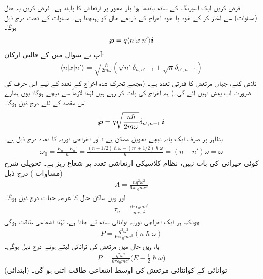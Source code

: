 فرض کریں ایک  اسپرنگ کے ساتھ باندھا ہوا بار  محور  پر ارتعاش کا پابند ہے۔ فرض  کریں یہ حال  (مساوات)  سے آغاز کر کے خود با خود اخراج   کے ذریعے  حال  کو  پہنچتا ہے۔ مساوات کے تحت درج ذیل ہوگا۔
\begin{align*}
	{\ensuremath{{\boldsymbol{\wp}}}} = q\langle n|x|n'\rangle{\boldsymbol{i}}
\end{align*}
آپ نے سوال  میں  کے قالبی ارکان:
\begin{align*}
	\langle n|x|n'\rangle = \sqrt{\frac{\hslash}{2m\omega}}(\sqrt{n'}\delta_{n,n'-1}+\sqrt{n}\delta_{n',n-1})
\end{align*}
 تلاش کئے، جہاں مرتعش کا  قدرتی تعدد  ہے۔ (مجھے تحرک شدہ اخراج کے تعدد کے لیے اس حرف کی ضرورت اب پیش نہیں آئے گی۔)   ہم اخراج کی بات کر رہے ہیں لہٰذا  لازماً   سے نیچے  ہوگا؛ یوں  ہمارے اس مقصد کے لئے درج ذیل ہوگا۔
\begin{align}
	{\ensuremath{{\boldsymbol{\wp}}}} = q\sqrt{\frac{n\hslash}{2m\omega}}\delta_{n', n-1}\,{\boldsymbol{i}}
\end{align}
بظاہر    پر صرف ایک پایہ   نیچے تحویل  ممکن ہے ؛  اور اخراجی نوریہ کا تعدد درج ذیل ہے۔
\begin{align}
	\omega_0 = \frac{E_n-E_n'}{\hslash} = \frac{(n+1/2)\hslash\omega - (n'+ 1/2)\hslash\omega}{\hslash} =(n-n')\omega = \omega
\end{align}
کوئی حیرانی  کی بات نہیں،  نظام کلاسیکی ارتعاشی تعدد پر  شعاع ریز   ہے۔ تحویلی شرح  (مساوات )  درج ذیل
\begin{align}
	A = \frac{nq^2\omega^2}{6\pi\epsilon_0mc^3}
\end{align}
اور ویں ساکن حال کا عرصہ حیات درج ذیل ہوگا۔
\begin{align}
	\tau_n = \frac{6\pi\epsilon_0mc^3}{nq^2\omega^2}
\end{align}
چونکہ،  ہر ایک اخراجی نوریہ  توانائی ساتھ لے جاتا ہے،  لہٰذا  اشعاعی  طاقت  ہوگی
\begin{align*}
	P = \frac{q^2\omega^2}{6\pi\epsilon_0mc^3}(n\hslash\omega)
\end{align*}
یا،  ویں حال میں مرتعش کی توانائی  لیتے ہوئے درج ذیل ہوگی۔
\begin{align}\label{مساوات_تابع_مضطرب_زمینی_توانائی_رہے_گی}
	P = \frac{q^2\omega^2}{6\pi\epsilon_0mc^3}\big(E-\frac{1}{2}\hslash\omega\big)
\end{align}
(ابتدائی)  توانائی  کے کوانٹائی مرتعش کی  اوسط اشعاعی     طاقت اتنی  ہو گی۔


